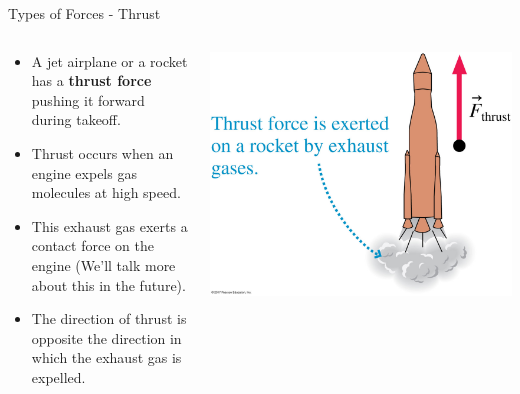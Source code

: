 \documentclass{beamer}
\begin{document}
\begin{frame}{Types of Forces - Thrust}
\begin{columns}
\begin{column}{0.6\textwidth}
\begin{itemize}
   \item A jet airplane or a rocket has a {\bf thrust force} pushing it forward during takeoff.
   \item Thrust occurs when an engine expels gas molecules at high speed.
   \item This exhaust gas exerts a contact force on the engine (We'll talk more about this in the future).
   \item The direction of thrust is opposite the direction in which the exhaust gas is expelled.
\end{itemize}
\end{column}
\begin{column}{0.4\textwidth}
\begin{center}
   \includegraphics[width=\textwidth]{../figures/05_10_Figure.jpg}
\end{center}
\end{column}
\end{columns}
\end{frame}
\end{document}
